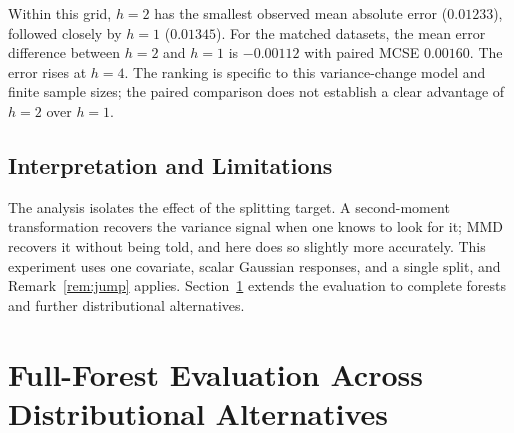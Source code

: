 \documentclass[12pt,a4paper]{article}
\newcommand{\1}{\mathbf 1}
\begin{document}
Within this grid, $h=2$ has the smallest observed mean absolute error ($0.01233$), followed closely by $h=1$ ($0.01345$). For the matched datasets, the mean error difference between $h=2$ and $h=1$ is $-0.00112$ with paired MCSE $0.00160$. The error rises at $h=4$. The ranking is specific to this variance-change model and finite sample sizes; the paired comparison does not establish a clear advantage of $h=2$ over $h=1$.

\subsection{Interpretation and Limitations}
The analysis isolates the effect of the splitting target. A second-moment transformation recovers the variance signal when one knows to look for it; MMD recovers it without being told, and here does so slightly more accurately. This experiment uses one covariate, scalar Gaussian responses, and a single split, and Remark~\ref{rem:jump} applies. Section~\ref{sec:fullforest} extends the evaluation to complete forests and further distributional alternatives.


\section{Full-Forest Evaluation Across Distributional Alternatives}\label{sec:fullforest}
\end{document}
